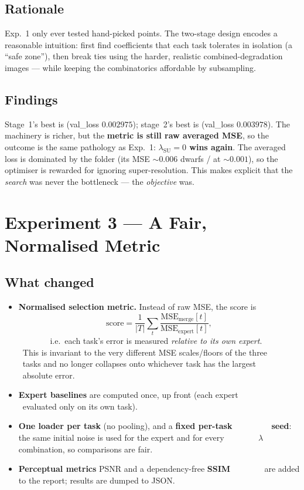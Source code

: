 \subsection*{Rationale}
Exp.~1 only ever tested hand-picked points. The two-stage design encodes a
reasonable intuition: first find coefficients that each task tolerates in
isolation (a ``safe zone''), then break ties using the harder, realistic
combined-degradation images --- while keeping the combinatorics affordable by
subsampling.

\subsection*{Findings}
Stage~1's best is  (val\_loss $0.002975$); stage~2's best is
 (val\_loss $0.003978$). The machinery is richer, but the
\textbf{metric is still raw averaged MSE}, so the outcome is the same pathology
as Exp.~1: \textbf{$\lambda_{\mathrm{SU}}=0$ wins again}. The averaged loss is
dominated by the  folder (its MSE $\sim 0.006$ dwarfs /
at $\sim 0.001$), so the optimiser is rewarded for ignoring super-resolution.
This makes explicit that the \emph{search} was never the bottleneck --- the
\emph{objective} was.

\section{Experiment 3 --- A Fair, Normalised Metric}

\subsection*{What changed}
\begin{itemize}[nosep,leftmargin=1.4em]
   \item \textbf{Normalised selection metric.} Instead of raw MSE, the score is
         \[
           \mathrm{score}=\frac{1}{|T|}\sum_{t}\frac{\mathrm{MSE}_{\mathrm{merge}}[t]}
           {\mathrm{MSE}_{\mathrm{expert}}[t]},
         \]
         i.e.\ each task's error is measured \emph{relative to its own expert}.
         This is invariant to the very different MSE scales/floors of the three
         tasks and no longer collapses onto whichever task has the largest
         absolute error.
   \item \textbf{Expert baselines} are computed once, up front (each expert
         evaluated only on its own task).
   \item \textbf{One loader per task} (no pooling), and a \textbf{fixed per-task
         seed}: the same initial noise is used for the expert and for every
         $\lambda$ combination, so comparisons are fair.
   \item \textbf{Perceptual metrics} PSNR and a dependency-free \textbf{SSIM}
         are added to the report; results are dumped to JSON.
\end{itemize}

